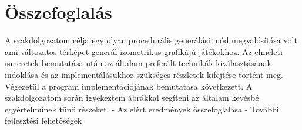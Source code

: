 \chapter{Összefoglalás}

A szakdolgozatom célja egy olyan procedurális generálási mód megvalósítása volt ami változatos térképet generál izometrikus grafikájú játékokhoz. Az elméleti ismeretek bemutatása után az általam preferált technikák kiválasztásának indoklása és az implementálásukhoz szükséges részletek kifejtése történt meg. Végezetül a program implementációjának bemutatása következett. A szakdolgozatom során igyekeztem ábrákkal segíteni az általam kevésbé egyértelműnek tűnő részeket. 
\newline
\newline
- Az elért eredmények összefoglalása
\newline - További fejlesztési lehetőségek
